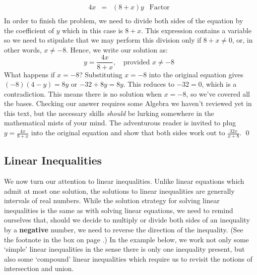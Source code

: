 \begin{ex}
\begin{enumerate}
\[\begin{array}{rclr}
4x & = & (8+x)y & \text{Factor} \\ \end{array}\]In order to finish the problem, we need to divide both sides of the equation by the coefficient of $y$ which in this case is $8+x$.  This expression contains a variable so we need to stipulate that we may perform this division only if $8 + x \neq 0$, or, in other words, $x \neq -8$.  Hence, we write our solution as:\[ y = \dfrac{4x}{8+x}, \quad \text{provided $x \neq -8$}\] What happens if $x = -8$?  Substituting $x = -8$ into the original equation gives $(-8)(4-y) = 8y$ or $-32 + 8y = 8y$.  This reduces to $-32 = 0$, which is a contradiction.  This means there is no solution when $x = -8$, so we've covered all the bases.  Checking our answer requires some Algebra we haven't reviewed yet in this text, but the necessary skills \emph{should} be lurking somewhere in the mathematical mists of your mind.  The adventurous reader is invited to plug $y = \frac{4x}{8 + x}$ into the original equation and show that both sides work out to $\frac{32x}{x + 8}$. \qed

\end{enumerate}

\end{ex}

\subsection{Linear Inequalities}
\label{LinearInequal}

We now turn our attention to linear inequalities.  Unlike linear equations which admit at most one solution, the solutions to linear inequalities are generally intervals of real numbers.  While the solution strategy for solving linear inequalities is the same as with solving linear equations, we need to remind ourselves that, should we decide to multiply or divide both sides of an inequality by a \textbf{negative} number, we need to reverse the direction of the inequality. (See the footnote in the box on page \pageref{equivalenteqnineq}.)  In the example below, we work not only some `simple' linear inequalities in the sense there is only one inequality present, but also some `compound' linear inequalities which require us to revisit the notions of intersection and union. 

